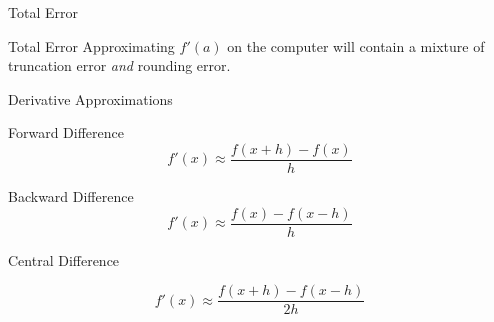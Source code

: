 \documentclass[10pt]{beamer}
\begin{document}




\begin{frame}{Total Error}
\begin{block}{Total Error}
Approximating $f'(a)$ on the computer will contain a mixture of truncation error \textit{and} rounding error.
\end{block}

\vspace{3mm}


\end{frame}


\begin{frame}{Derivative Approximations}

\begin{block}{Forward Difference}
    $$f'(x) \approx \frac{f(x+h)-f(x)}{h}$$
\end{block}

\begin{block}{Backward Difference}
    $$f'(x) \approx \frac{f(x)-f(x-h)}{h}$$
\end{block}

\begin{block}{Central Difference}

    $$f'(x) \approx \frac{f(x+h)-f(x-h)}{2h}$$
\end{block}



\end{frame}
\end{document}
